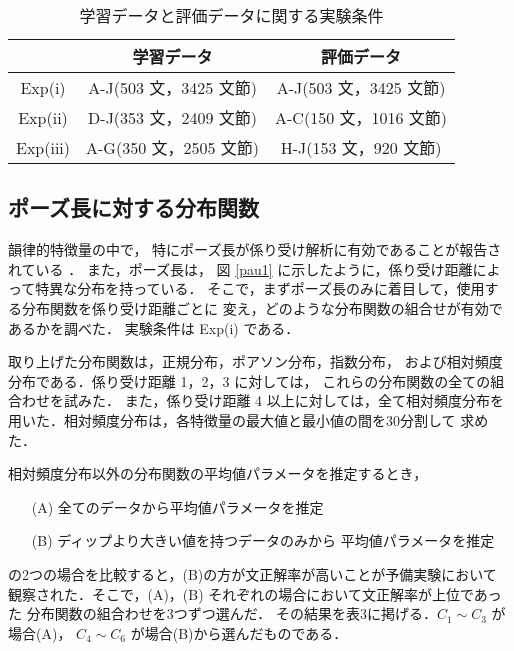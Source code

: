 \begin{table}
\caption{学習データと評価データに関する実験条件}
\label{cond:1}
\begin{center}
\begin{tabular}{|c|c|c|}
\hline
&
学習データ & 評価データ\\
\hline
Exp(i)&A-J(503 文，3425 文節)&A-J(503 文，3425 文節)\\
Exp(ii)&D-J(353 文，2409 文節)&A-C(150 文，1016 文節)\\
Exp(iii)&A-G(350 文，2505 文節)&H-J(153 文，920 文節)\\
\hline
\end{tabular}
\end{center}
\end{table}


\subsection{ポーズ長に対する分布関数}

韻律的特徴量の中で，
特にポーズ長が係り受け解析に有効であることが報告されている
\cite{EGU,KOU-1,KOU-2}．
また，ポーズ長は，
図 \ref{pau1} に示したように，係り受け距離によって特異な分布を持っている．
そこで，まずポーズ長のみに着目して，使用する分布関数を係り受け距離ごとに
変え，どのような分布関数の組合せが有効であるかを調べた．
実験条件は Exp(i) である．

取り上げた分布関数は，正規分布，ポアソン分布，指数分布，
および相対頻度分布である．係り受け距離 1，2，3 に対しては，
これらの分布関数の全ての組合わせを試みた．
また，係り受け距離 4 以上に対しては，全て相対頻度分布を
用いた．相対頻度分布は，各特徴量の最大値と最小値の間を30分割して
求めた．

相対頻度分布以外の分布関数の平均値パラメータを推定するとき，
\begin{itemize}
\item[(A)] 全てのデータから平均値パラメータを推定
\item[(B)] ディップより大きい値を持つデータのみから
平均値パラメータを推定
\end{itemize}
の2つの場合を比較すると，(B)の方が文正解率が高いことが予備実験において
観察された．そこで，(A)，(B) それぞれの場合において文正解率が上位であった
分布関数の組合わせを3つずつ選んだ．
その結果を表3に掲げる．$C_{1}\sim C_{3}$ が場合(A)，
$C_{4}\sim C_{6}$ が場合(B)から選んだものである．

